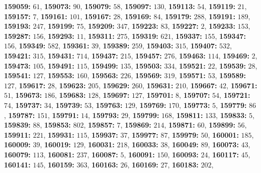 \textsf{\bfseries 159059:} $61$, \textsf{\bfseries 159073:} $90$, \textsf{\bfseries 159079:} $58$, \textsf{\bfseries 159097:} $130$, \textsf{\bfseries 159113:} $54$, \textsf{\bfseries 159119:} $21$, \textsf{\bfseries 159157:} $7$, \textsf{\bfseries 159161:} $101$, \textsf{\bfseries 159167:} $28$, \textsf{\bfseries 159169:} $84$, \textsf{\bfseries 159179:} $288$, \textsf{\bfseries 159191:} $189$, \textsf{\bfseries 159193:} $247$, \textsf{\bfseries 159199:} $75$, \textsf{\bfseries 159209:} $347$, \textsf{\bfseries 159223:} $83$, \textsf{\bfseries 159227:} $2$, \textsf{\bfseries 159233:} $153$, \textsf{\bfseries 159287:} $156$, \textsf{\bfseries 159293:} $11$, \textsf{\bfseries 159311:} $275$, \textsf{\bfseries 159319:} $621$, \textsf{\bfseries 159337:} $155$, \textsf{\bfseries 159347:} $156$, \textsf{\bfseries 159349:} $582$, \textsf{\bfseries 159361:} $39$, \textsf{\bfseries 159389:} $259$, \textsf{\bfseries 159403:} $315$, \textsf{\bfseries 159407:} $532$, \textsf{\bfseries 159421:} $315$, \textsf{\bfseries 159431:} $714$, \textsf{\bfseries 159437:} $215$, \textsf{\bfseries 159457:} $276$, \textsf{\bfseries 159463:} $114$, \textsf{\bfseries 159469:} $2$, \textsf{\bfseries 159473:} $105$, \textsf{\bfseries 159491:} $115$, \textsf{\bfseries 159499:} $135$, \textsf{\bfseries 159503:} $334$, \textsf{\bfseries 159521:} $22$, \textsf{\bfseries 159539:} $28$, \textsf{\bfseries 159541:} $127$, \textsf{\bfseries 159553:} $160$, \textsf{\bfseries 159563:} $226$, \textsf{\bfseries 159569:} $319$, \textsf{\bfseries 159571:} $53$, \textsf{\bfseries 159589:} $127$, \textsf{\bfseries 159617:} $28$, \textsf{\bfseries 159623:} $205$, \textsf{\bfseries 159629:} $260$, \textsf{\bfseries 159631:} $210$, \textsf{\bfseries 159667:} $42$, \textsf{\bfseries 159671:} $51$, \textsf{\bfseries 159673:} $186$, \textsf{\bfseries 159683:} $128$, \textsf{\bfseries 159697:} $127$, \textsf{\bfseries 159701:} $8$, \textsf{\bfseries 159707:} $54$, \textsf{\bfseries 159721:} $74$, \textsf{\bfseries 159737:} $34$, \textsf{\bfseries 159739:} $53$, \textsf{\bfseries 159763:} $129$, \textsf{\bfseries 159769:} $170$, \textsf{\bfseries 159773:} $5$, \textsf{\bfseries 159779:} $86$, \textsf{\bfseries 159787:} $151$, \textsf{\bfseries 159791:} $14$, \textsf{\bfseries 159793:} $29$, \textsf{\bfseries 159799:} $168$, \textsf{\bfseries 159811:} $133$, \textsf{\bfseries 159833:} $5$, \textsf{\bfseries 159839:} $88$, \textsf{\bfseries 159853:} $802$, \textsf{\bfseries 159857:} $7$, \textsf{\bfseries 159869:} $214$, \textsf{\bfseries 159871:} $60$, \textsf{\bfseries 159899:} $56$, \textsf{\bfseries 159911:} $221$, \textsf{\bfseries 159931:} $115$, \textsf{\bfseries 159937:} $37$, \textsf{\bfseries 159977:} $87$, \textsf{\bfseries 159979:} $50$, \textsf{\bfseries 160001:} $185$, \textsf{\bfseries 160009:} $39$, \textsf{\bfseries 160019:} $129$, \textsf{\bfseries 160031:} $218$, \textsf{\bfseries 160033:} $38$, \textsf{\bfseries 160049:} $89$, \textsf{\bfseries 160073:} $43$, \textsf{\bfseries 160079:} $113$, \textsf{\bfseries 160081:} $237$, \textsf{\bfseries 160087:} $5$, \textsf{\bfseries 160091:} $150$, \textsf{\bfseries 160093:} $24$, \textsf{\bfseries 160117:} $45$, \textsf{\bfseries 160141:} $145$, \textsf{\bfseries 160159:} $363$, \textsf{\bfseries 160163:} $26$, \textsf{\bfseries 160169:} $27$, \textsf{\bfseries 160183:} $202$, 
